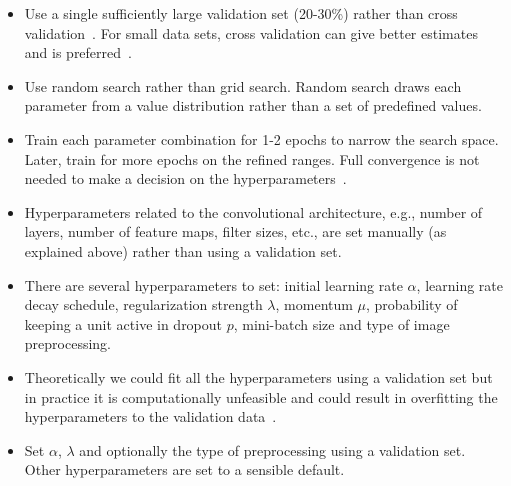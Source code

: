 \begin{itemize}

	\item Use a single sufficiently large validation set (20-30\%) rather than cross validation~\cite{Bengio2014}. For small data sets, cross validation can give better estimates and is preferred~\cite{Ng2014}.

	\item Use random search rather than grid search. Random search draws each parameter from a value distribution rather than a set of predefined values.~\cite{Bergstra2012}

	\item Train each parameter combination for 1-2 epochs to narrow the search space. Later, train for more epochs on the refined ranges. Full convergence is not needed to make a decision on the hyperparameters~\cite{Karpathy2015}.


	\item Hyperparameters related to the convolutional architecture, e.g., number of layers, number of feature maps, filter sizes, etc., are set manually (as explained above) rather than using a validation set.

	\item There are several hyperparameters to set: initial learning rate $\alpha$, learning rate decay schedule, regularization strength $\lambda$, momentum $\mu$, probability of keeping a unit active in dropout $p$, mini-batch size and type of image preprocessing.

	\item Theoretically we could fit all the hyperparameters using a validation set but in practice it is computationally unfeasible and could result in overfitting the hyperparameters to the validation data~\cite{Cawley2010}.

	\item Set $\alpha$, $\lambda$ and optionally the type of preprocessing using a validation set. Other hyperparameters are set to a sensible default.



\end{itemize}

